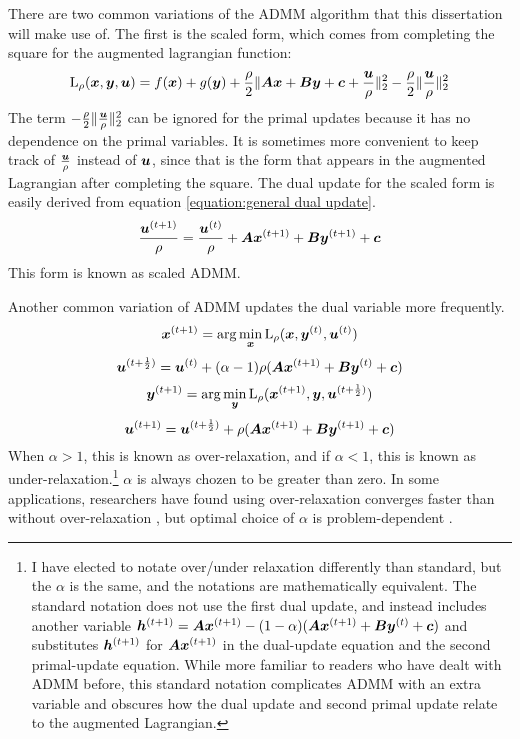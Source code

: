 There are two common variations of the ADMM algorithm that this dissertation will make use of.  The first is the scaled form, which comes from completing the square for the augmented lagrangian function:
%
\begin{equation}
\operatorname{L}_{\rho}(\bm{x},\bm{y},\bm{u}) = f(\bm{x}) + g(\bm{y}) + \frac{\rho}{2}\|\bm{A}\bm{x} + \bm{B}\bm{y} + \bm{c} + \frac{\bm{u}}{\rho}\|_2^2 - \frac{\rho}{2}\|\frac{\bm{u}}{\rho}\|_2^2
\end{equation}
%
The term $-\frac{\rho}{2}\|\frac{\bm{u}}{\rho}\|_2^2$ can be ignored for the primal updates because it has no dependence on the primal variables. It is sometimes more convenient to keep track of $\frac{\bm{u}}{\rho}$ instead of $\bm{u}$, since that is the form that appears in the augmented Lagrangian after completing the square. The dual update for the scaled form is easily derived from equation \ref{equation:general dual update}.
%
\begin{equation}
\frac{\bm{u}^{(t + 1)}}{\rho} = \frac{\bm{u}^{(t)}}{\rho} + \bm{A}\bm{x}^{(t + 1)} + \bm{B}\bm{y}^{(t + 1)} + \bm{c}
\end{equation}
%
This form is known as scaled ADMM.

Another common variation of ADMM updates the dual variable more frequently.
\begin{equation}
\bm{x}^{(t + 1)} = \arg\min_{\bm{x}} \operatorname{L}_{\rho}(\bm{x},\bm{y}^{(t)},\bm{u}^{(t)})
\end{equation}
%
\begin{equation}
\bm{u}^{(t + \frac{1}{2})} = \bm{u}^{(t)} + (\alpha - 1)\rho(\bm{A}\bm{x}^{(t + 1)} + \bm{B}\bm{y}^{(t)} + \bm{c})
\end{equation}
%
\begin{equation}
\bm{y}^{(t + 1)} = \arg\min_{\bm{y}} \operatorname{L}_{\rho}(\bm{x}^{(t + 1)},\bm{y},\bm{u}^{(t + \frac{1}{2})})
\end{equation}
%
\begin{equation}
\bm{u}^{(t + 1)} = \bm{u}^{(t + \frac{1}{2})} + \rho(\bm{A}\bm{x}^{(t + 1)} + \bm{B}\bm{y}^{(t + 1)} + \bm{c})
\end{equation}
%
When $\alpha > 1$, this is known as over-relaxation, and if $\alpha < 1$, this is known as under-relaxation.\footnote{I have elected to notate over/under relaxation differently than standard, but the $\alpha$ is the same, and the notations are mathematically equivalent. The standard notation does not use the first dual update, and instead includes another variable $\bm{h}^{(t + 1)} = \bm{A}\bm{x}^{(t + 1)} - (1 - \alpha)(\bm{A}\bm{x}^{(t + 1)} + \bm{B}\bm{y}^{(t)} + \bm{c})$ and substitutes $\bm{h}^{(t + 1)}$ for $\bm{A}\bm{x}^{(t + 1)}$ in the dual-update equation and the second primal-update equation. While more familiar to readers who have dealt with ADMM before, this standard notation complicates ADMM with an extra variable and obscures how the dual update and second primal update relate to the augmented Lagrangian.} $\alpha$ is always chozen to be greater than zero. In some applications, researchers have found using over-relaxation converges faster than without over-relaxation \cite{eckstein1994parallel}, but optimal choice of $\alpha$ is problem-dependent \cite{nishihara2015general}.

